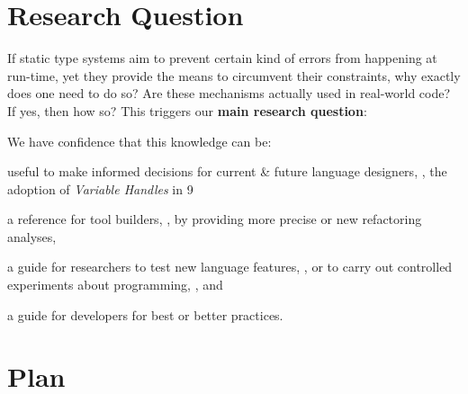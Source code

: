 \section{Research Question}

If static type systems aim to prevent certain kind of errors from happening at run-time,
yet they provide the means to circumvent their constraints,
why exactly does one need to do so?
Are these mechanisms actually used in real-world code?
If yes, then how so?
This triggers our \textbf{main research question}:


We have confidence that this knowledge can be:
\begin{inparaenum}[a)]
\item useful to make informed decisions for current \& future language designers,
\eg{}, the adoption of \emph{Variable Handles} in \java{} 9~\cite{jep193}
\item a reference for tool builders, \eg{}, by providing more precise or new refactoring analyses,
\item a guide for researchers to test new language features, \eg{}, \cite{wintherGuardedTypePromotion2011} or to carry out controlled experiments about programming, \eg{}, \cite{stuchlikStaticVsDynamic2011} and
\item a guide for developers for best or better practices.
\end{inparaenum}

\section{Plan}

